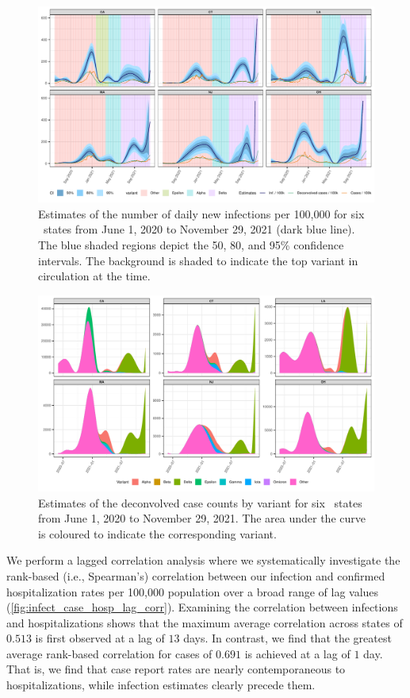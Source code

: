 \documentclass{article}
\begin{document}
\begin{figure}[!tb]
\centering
    \includegraphics[width=.9\linewidth]{state_niauc_est_6states_F24.pdf}
    \caption{Estimates of the number of daily new infections per 100,000 for
    six \US\ states from June 1, 2020 to November 29, 2021 (dark blue
    line). The blue shaded regions depict the 50, 80, and 95\% confidence
    intervals. The background is shaded to indicate the top variant in
    circulation at the time.}
    \label{fig:six_state_est}
\end{figure}


\begin{figure}[!tb]
\centering
    \includegraphics[width=.9\linewidth]{state_decon_byvar_est_6states_F24.pdf}
    \caption{Estimates of the deconvolved case counts by variant for
    six \US\ states from June 1, 2020 to November 29, 2021. 
    The area under the curve is coloured to indicate the corresponding variant.}
    \label{fig:six_state_decon_byvar_est}
\end{figure}

We perform a lagged correlation analysis where we systematically investigate the
rank-based (i.e., Spearman's) correlation between our infection and confirmed
hospitalization rates per 100,000 population over a broad range of lag values
(\autoref{fig:infect_case_hosp_lag_corr}). Examining the correlation between infections and
hospitalizations shows that the maximum average correlation across states of $0.513$ is 
first observed at a lag of $13$ days. In contrast, we find that the greatest average
rank-based correlation for cases of $0.691$ is achieved at a lag of 
$1$ day. That is, we find that case report rates are nearly contemporaneous to 
hospitalizations, while infection estimates clearly precede them. 
\end{document}

